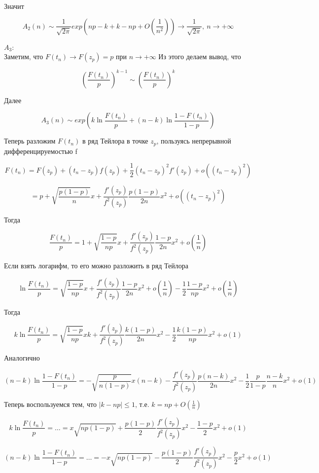 \documentclass{article}
\begin{document}
Значит

$$ A_2(n)\sim \frac{1}{\sqrt{2\pi}}exp\left( np - k + k - np + O\left(\frac{1}{n^2}\right) \right)\rightarrow \frac{1}{\sqrt{2\pi}},\ n\rightarrow+\infty $$

$A_3$:\\

Заметим, что $F(t_n)\rightarrow F(z_p) = p$ при $n\rightarrow+\infty$ Из этого делаем вывод, что

$$ \left(\frac{F(t_n)}{p}\right)^{k-1} \sim  \left(\frac{F(t_n)}{p}\right)^{k} $$

Далее

$$A_3(n)\sim exp\left( k\ln{\frac{F(t_n)}{p}} + (n-k)\ln{\frac{1 - F(t_n)}{1 - p}} \right)$$

Теперь разложим $F(t_n)$ в ряд Тейлора в точке $z_p$, пользуясь непрерывной дифференцируемостью f

$$ F(t_n) = F(z_p) + (t_n - z_p)f(z_p) + \frac{1}{2}(t_n-z_p)^2f'(z_p) + o((t_n-z_p)^2) $$

$$ = p + \sqrt{\frac{p(1-p)}{n}}x + \frac{f'(z_p)}{f^2(z_p)}\frac{p(1-p)}{2n}x^2 + o((t_n-z_p)^2) $$

Тогда

$$ \frac{F(t_n)}{p} = 1 + \sqrt{\frac{1-p}{np}}x + \frac{f'(z_p)}{f^2(z_p)}\frac{1-p}{2n}x^2 + o\left(\frac{1}{n}\right)  $$

Если взять логарифм, то его можно разложить в ряд Тейлора

$$ \ln{\frac{F(t_n)}{p}} =  \sqrt{\frac{1-p}{np}}x + \frac{f'(z_p)}{f^2(z_p)}\frac{1-p}{2n}x^2 + o\left(\frac{1}{n}\right) - \frac{1}{2}\frac{1-p}{np}x^2 + o\left(\frac{1}{n}\right) $$

Тогда

$$ k\ln{\frac{F(t_n)}{p}} =  \sqrt{\frac{1-p}{np}}xk + \frac{f'(z_p)}{f^2(z_p)}\frac{k(1-p)}{2n}x^2  - \frac{1}{2}\frac{k(1-p)}{np}x^2 + o(1) $$

Аналогично

$$ (n-k)\ln{\frac{1 - F(t_n)}{1 - p}} = -\sqrt{\frac{p}{n(1-p)}}x(n-k) - \frac{f'(z_p)}{f^2(z_p)}\frac{p(n-k)}{2n}x^2 - \frac{1}{2}\frac{p}{1-p}\frac{n-k}{n}x^2 + o(1) $$

Теперь воспользуемся тем, что $|k - np|\leq 1$, т.е. $k = np + O\left(\frac{1}{n}\right)$

$$ k\ln{\frac{F(t_n)}{p}} = \dots = x\sqrt{np(1-p)} + \frac{p(1-p)}{2}\frac{f'(z_p)}{f^2(z_p)}x^2 - \frac{1-p}{2}x^2 + o(1)$$

$$(n-k)\ln{\frac{1 - F(t_n)}{1 - p}} = \dots = -x\sqrt{np(1-p)} -\frac{p(1-p)}{2}\frac{f'(z_p)}{f^2(z_p)}x^2 - \frac{p}{2}x^2 + o(1)$$
\end{document}

